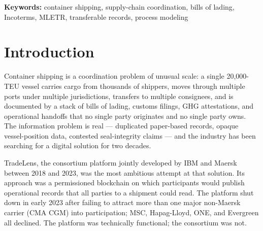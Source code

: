 \documentclass[11pt,a4paper]{article}
\theoremstyle{definition}
\theoremstyle{remark}
\begin{document}
\begin{abstract}
The schemas the composition draws on are largely existing infrastructure
(commerce, geo, handoff, jurisdiction, fulfilment, GHG family,
proximity); two new schemas (container-seal, Incoterms-2020-as-anchor)
extend the protocol's surface in ways that respect the
extension-doctrine. We also treat the bill-of-lading transferability
question through the cancellable-seller / counter-process pattern that
expresses transferability at the protocol layer without weakening the
kernel's invariants.

The paper is in industrial-engineering register: the contribution is
the composition and its operational properties, not novel
mechanism-design results. Why TradeLens failed and what a bonded
replacement at the same perimeter looks like architecturally are
answerable as supply-chain coordination questions.
\end{abstract}

\medskip
\noindent\textbf{Keywords:}
container shipping, supply-chain coordination, bills of lading,
Incoterms, MLETR, transferable records, process modeling

\section{Introduction}
\label{sec:intro}

Container shipping is a coordination problem of unusual scale: a
single 20{,}000-TEU vessel carries cargo from thousands of shippers,
moves through multiple ports under multiple jurisdictions, transfers
to multiple consignees, and is documented by a stack of bills of
lading, customs filings, GHG attestations, and operational handoffs
that no single party originates and no single party owns. The
information problem is real --- duplicated paper-based records,
opaque vessel-position data, contested seal-integrity claims --- and
the industry has been searching for a digital solution for two
decades.

TradeLens, the consortium platform jointly developed by IBM and
Maersk between 2018 and 2023, was the most ambitious attempt at
that solution. Its approach was a permissioned blockchain on which
participants would publish operational records that all parties to
a shipment could read. The platform shut down in early 2023 after
failing to attract more than one major non-Maersk carrier (CMA CGM)
into participation; MSC, Hapag-Lloyd, ONE, and Evergreen all
declined. The platform was technically functional; the consortium
was not.
\end{document}
